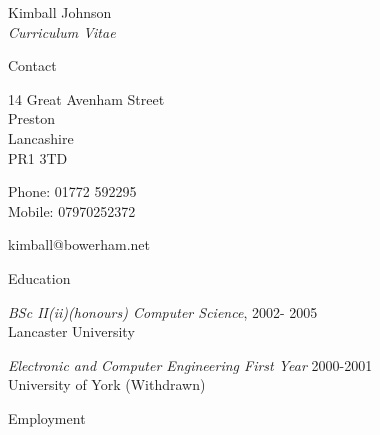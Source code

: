 \documentclass[10pt]{article}
\begin{document}
\newlength{\oldcvlabelwidth}
\renewcommand*{\cvbibname}{}

\begin{cv}{Kimball Johnson\\{\large \itshape Curriculum Vitae}}

\begin{cvlist}{Contact}
	\item
	14 Great Avenham Street\\
	Preston\\
	Lancashire\\
	PR1 3TD
	\item Phone: 01772 592295\\
	Mobile: 07970252372
	\item kimball@bowerham.net
\end{cvlist}

\begin{cvlist}{Education}
	\item \emph{BSc II(ii)(honours) Computer Science}, 2002- 2005\\
	Lancaster University
    \item \emph{Electronic and Computer Engineering First Year} 2000-2001\\
    University of York (Withdrawn)
\end{cvlist}

\begin{cvlist}{Employment}


\end{cvlist}
\end{cv}
\end{document}
